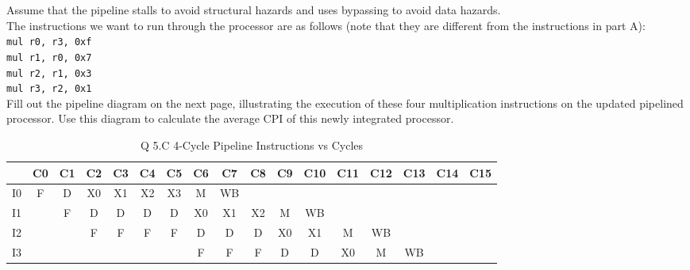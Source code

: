 \documentclass[a4paper,11pt]{article}
\begin{document}
Assume that the pipeline stalls to avoid structural hazards and uses bypassing to avoid data hazards. \\

The instructions we want to run through the processor are as follows (note that they are different from the instructions in part A): \\
\texttt{mul r0, r3, 0xf} \\
\texttt{mul r1, r0, 0x7} \\
\texttt{mul r2, r1, 0x3} \\
\texttt{mul r3, r2, 0x1} \\

Fill out the pipeline diagram on the next page, illustrating the execution of these four multiplication instructions on the updated pipelined processor. Use this diagram to calculate the average CPI of this newly integrated processor.



\begin{table}[H]
\caption{Q 5.C 4-Cycle Pipeline Instructions vs Cycles}
\begin{center}
\begin{tabular}{|c|c|c|c|c|c|c|c|c|c|c|c|c|c|c|c|c|} \hline
     & C0 & C1 & C2 & C3 & C4  & C5  & C6   & C7   & C8 & C9 & C10 & C11 & C12 & C13 & C14 & C15  \\ \hline
  I0 & F  &  D & X0 & X1 & X2  & X3  & M    & WB   &    &     &     &     &     &     &    &      \\ \hline   
  I1 &    &  F & D  & D  & D   & D   & X0   & X1   & X2 & M   & WB  &     &     &     &    &      \\ \hline   
  I2 &    &    & F  & F  & F   & F   & D    & D    & D  & X0  & X1  & M   &  WB &     &    &      \\ \hline   
  I3 &    &    &    &    &     &     & F    & F    & F  & D   & D   & X0  &  M  & WB  &    &      \\ \hline   
\end{tabular}
\end{center}
\end{table}
\end{document}

